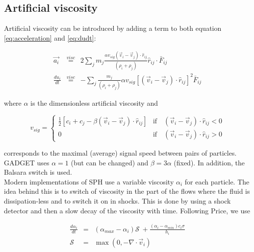 \documentclass[a4paper,10pt]{article}
\begin{document}
\subsection{Artificial viscosity}

 Artificial viscosity can be introduced by adding a term to both equation \ref{eq:acceleration} and \ref{eq:dudt}:

\begin{eqnarray}
  \vec{a_i} &\stackrel{visc}{=}& 2\sum_j m_j \frac{\alpha v_{sig}\left(\vec{v}_i -
\vec{v}_j\right)\cdot\hat{r}_{ij}}{\left(\rho_i + \rho_j\right)}\hat{r}_{ij}\cdot \bar{F}_{ij} \label{eq:visc}\\
 \frac{du_i}{dt} &\stackrel{visc}{=}& -\sum_j \frac{m_j}{(\rho_i + \rho_j)} \alpha
v_{sig}\left[\left(\vec{v}_i-\vec{v}_j\right)\cdot\hat{r}_{ij}\right]^2 \bar{F}_{ij}
\end{eqnarray}

where $\alpha$ is the dimensionless artificial viscosity and

\begin{equation}
 v_{sig} = \begin{cases}
	    \frac{1}{2}\left[c_i + c_j - \beta\left(\vec{v}_i-\vec{v}_j\right)\cdot\hat{r}_{ij} \right] &
\mbox{if} \quad \left(\vec{v}_i-\vec{v}_j\right)\cdot \hat{r}_{ij} < 0\\
            0 & \mbox{if} \quad \left(\vec{v}_i-\vec{v}_j\right)\cdot \hat{r}_{ij} > 0
            \end{cases}
\end{equation}

corresponds to the maximal (average) signal speed between pairs of particles.
GADGET uses $\alpha=1$ (but can be changed) and $\beta=3\alpha$ (fixed). In addition, the Balsara switch is used. \\

Modern implementations of SPH use a variable viscosity $\alpha_i$ for each particle. The idea behind this is to switch
of viscosity in the part of the flows where the fluid is dissipation-less and to switch it on in shocks. This is done by
using a shock detector and then a slow decay of the viscosity with time. Following Price, we use

\begin{eqnarray}
 \frac{d\alpha_i}{dt} &=& \left(\alpha_{max}-\alpha_i\right)\mathcal{S}~+\frac{(\alpha_i-\alpha_{min})c_i\sigma}{h_i}\\
 \mathcal{S} &=& \max\left(0, -\nabla\cdot \vec{v}_i \right)
\end{eqnarray}
\end{document}
